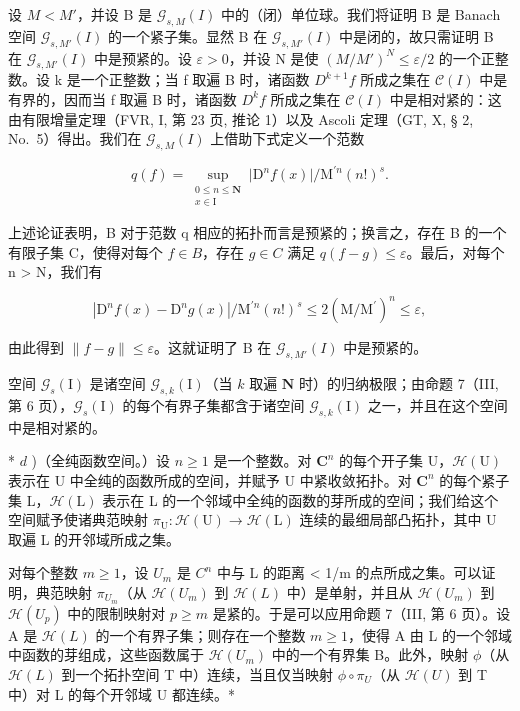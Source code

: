 设 \(M < M'\)，并设 B 是 \(\mathcal{G}_{s,M}(I)\) 中的（闭）单位球。我们将证明 B 是 Banach 空间 \(\mathcal{G}_{s,M'}(I)\) 的一个紧子集。显然 B 在 \(\mathcal{G}_{s,M'}(I)\) 中是闭的，故只需证明 B 在 \(\mathcal{G}_{s,M'}(I)\) 中是预紧的。设 \(\varepsilon > 0\)，并设 N 是使 \((M/M')^N \leqslant \varepsilon/2\) 的一个正整数。设 k 是一个正整数；当 f 取遍 B 时，诸函数 \(D^{k+1}f\) 所成之集在 \(\mathcal{C}(I)\) 中是有界的，因而当 f 取遍 B 时，诸函数 \(D^k f\) 所成之集在 \(\mathcal{C}(I)\) 中是相对紧的：这由有限增量定理（FVR, I, 第 23 页, 推论 1）以及 Ascoli 定理（GT, X, § 2, No.~5）得出。我们在 \(\mathcal{G}_{s,M}(I)\) 上借助下式定义一个范数

\[
q(f) = \sup_{\substack{0\leqslant n\leqslant \mathbf{N}\\ x\in \mathrm{I}}}\big|\mathrm{D}^{n}f(x)\big| / \mathrm{M}^{\prime n}(n!)^{s}  .
\]

上述论证表明，B 对于范数 q 相应的拓扑而言是预紧的；换言之，存在 B 的一个有限子集 C，使得对每个 \(f \in B\)，存在 \(g \in C\) 满足 \(q(f - g) \leqslant \varepsilon\)。最后，对每个 n \textgreater{} N，我们有

\[
\left| \mathrm{D} ^ {n} f (x) - \mathrm{D} ^ {n} g (x) \right| / \mathrm{M} ^ {\prime n} (n!) ^ {s} \leqslant 2 (\mathrm{M} / \mathrm{M} ^ {\prime}) ^ {n} \leqslant \varepsilon ,
\]

由此得到 \(\| f - g\| \leqslant \varepsilon\)。这就证明了 B 在 \(\mathcal{G}_{s,M'}(I)\) 中是预紧的。

空间 \(\mathcal{G}_s(\mathrm{I})\) 是诸空间 \(\mathcal{G}_{s,k}(\mathrm{I})\)（当 \(k\) 取遍 \(\mathbf{N}\) 时）的归纳极限；由命题 7（III, 第 6 页），\(\mathcal{G}_s(\mathrm{I})\) 的每个有界子集都含于诸空间 \(\mathcal{G}_{s,k}(\mathrm{I})\) 之一，并且在这个空间中是相对紧的。

* \(d\) )（全纯函数空间。）设 \(n \geqslant 1\) 是一个整数。对 \(\mathbf{C}^n\) 的每个开子集 U，\(\mathcal{H}(\mathrm{U})\) 表示在 U 中全纯的函数所成的空间，并赋予 U 中紧收敛拓扑。对 \(\mathbf{C}^n\) 的每个紧子集 L，\(\mathcal{H}(\mathrm{L})\) 表示在 L 的一个邻域中全纯的函数的芽所成的空间；我们给这个空间赋予使诸典范映射 \(\pi_{\mathrm{U}}:\mathcal{H}(\mathrm{U})\to\mathcal{H}(\mathrm{L})\) 连续的最细局部凸拓扑，其中 U 取遍 L 的开邻域所成之集。

对每个整数 \(m \geqslant 1\)，设 \(U_{m}\) 是 \(C^{n}\) 中与 L 的距离 \textless{} 1/m 的点所成之集。可以证明，典范映射 \(\pi_{U_{m}}\)（从 \(\mathcal{H}(U_{m})\) 到 \(\mathcal{H}(L)\) 中）是单射，并且从 \(\mathcal{H}(U_{m})\) 到 \(\mathcal{H}(U_{p})\) 中的限制映射对 \(p \geqslant m\) 是紧的。于是可以应用命题 7（III, 第 6 页）。设 A 是 \(\mathcal{H}(L)\) 的一个有界子集；则存在一个整数 \(m \geqslant 1\)，使得 A 由 L 的一个邻域中函数的芽组成，这些函数属于 \(\mathcal{H}(U_{m})\) 中的一个有界集 B。此外，映射 \(\phi\)（从 \(\mathcal{H}(L)\) 到一个拓扑空间 T 中）连续，当且仅当映射 \(\phi \circ \pi_{U}\)（从 \(\mathcal{H}(U)\) 到 T 中）对 L 的每个开邻域 U 都连续。*

